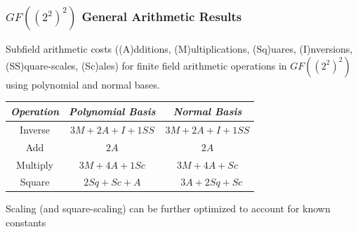 \documentclass[10pt]{beamer}
\begin{document}
\begin{frame}
	\frametitle{$GF((2^2)^2)$ General Arithmetic Results}
Subfield arithmetic costs ((A)dditions, (M)ultiplications, (Sq)uares, (I)nversions, (SS)quare-scales, (Sc)ales) for finite field arithmetic operations in $GF((2^2)^2)$ using polynomial and normal bases.
\begin{table}[ht!]
\begin{center}
	\begin{tabular}{| c | c | c |} \hline
	\emph{Operation} & \emph{Polynomial Basis} & \emph{Normal Basis} \\ \hline
	Inverse & $3M + 2A + I + 1SS$ & $3M + 2A + I + 1SS$ \\
	Add & $2A$ & $2A$ \\
	Multiply & $3M + 4A + 1Sc$ & $3M + 4A + Sc$ \\
	Square & $2Sq + Sc + A$ & ~ $3A + 2Sq + Sc$ \\ \hline
	\end{tabular}
\end{center}
\end{table}

Scaling (and square-scaling) can be further optimized to account for known constants

\end{frame}
\end{document}
